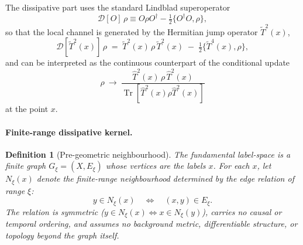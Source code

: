\documentclass[12pt,a4paper]{article}
\newtheorem{definition}{Definition}[section]
\renewcommand{\Tr}{\operatorname{Tr}}
\numberwithin{equation}{section}
\begin{document}
\noindent The dissipative part uses the standard Lindblad superoperator
\begin{equation}
\mathcal{D}[O]\,\rho \equiv O\rho O^\dagger - \tfrac12\{O^\dagger O,\rho\},
\label{eq:superoperator}
\end{equation}
so that the local channel is generated by the Hermitian jump operator
$\tilde{T}^2(x)$,
\begin{equation}
\mathcal{D}[\tilde{T}^2(x)]\,\rho \;=\; \tilde{T}^2(x)\,\rho\,\tilde{T}^2(x)
\;-\; \tfrac12\{\tilde{T}^4(x),\rho\},
\label{eq:wesh-local-diss}
\end{equation}
and can be interpreted as the continuous counterpart of the conditional
update
\begin{equation}
\rho \ \longrightarrow \
\frac{\hat{T}^2(x)\,\rho\,\hat{T}^2(x)}{\Tr[\hat{T}^2(x)\rho\hat{T}^2(x)]}
\label{eq:cupdate}
\end{equation}
at the point $x$.

\paragraph{Finite-range dissipative kernel.}

\begin{definition}[Pre-geometric neighbourhood]\label{def:Nxi}
The fundamental label-space is a finite graph $G_\xi=(X,E_\xi)$ whose
vertices are the labels $x$. For each $x$, let $N_\xi(x)$ denote the
finite-range neighbourhood determined by the edge relation of range $\xi$:
\[
y\in N_\xi(x)\quad \Longleftrightarrow \quad (x,y)\in E_\xi.
\]
The relation is \emph{symmetric}
($y\in N_\xi(x) \Leftrightarrow x\in N_\xi(y)$), carries no causal
or temporal ordering, and assumes no background metric, differentiable
structure, or topology beyond the graph itself.
\end{definition}
\end{document}
